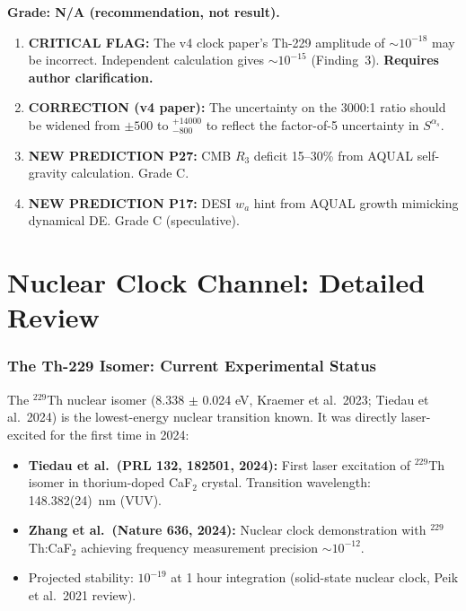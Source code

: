 \documentclass[11pt]{article}
\begin{document}
\begin{tcolorbox}[colback=blue!5!white, colframe=blue!70!black,
  title=\textbf{W4i22 TOP 5 FINDINGS --- PREDICTIONS TEAM}]
\begin{enumerate}
  \textbf{Grade: N/A (recommendation, not result).}

\end{enumerate}
\end{tcolorbox}


\begin{tcolorbox}[colback=red!5!white, colframe=red!60!black,
  title=\textbf{CORRECTIONS AND FLAGS}]
\begin{enumerate}[nosep]
\item \textbf{CRITICAL FLAG:}  The v4 clock paper's Th-229 amplitude of
  $\sim 10^{-18}$ may be incorrect.  Independent calculation gives
  $\sim 10^{-15}$ (Finding~3).  \textbf{Requires author clarification.}

\item \textbf{CORRECTION (v4 paper):}  The uncertainty on the 3000:1
  ratio should be widened from $\pm 500$ to $^{+14000}_{-800}$ to
  reflect the factor-of-5 uncertainty in $S^{\alpha_s}$.

\item \textbf{NEW PREDICTION P27:}  CMB $R_3$ deficit 15--30\% from
  AQUAL self-gravity calculation.  Grade C.

\item \textbf{NEW PREDICTION P17:}  DESI $w_a$ hint from AQUAL growth
  mimicking dynamical DE.  Grade C (speculative).
\end{enumerate}
\end{tcolorbox}


\part{Nuclear Clock Channel: Detailed Review}

\section{The Th-229 Isomer: Current Experimental Status}

The $^{229}$Th nuclear isomer (8.338 $\pm$ 0.024 eV, Kraemer et al.\ 2023;
Tiedau et al.\ 2024) is the lowest-energy nuclear transition known.
It was directly laser-excited for the first time in 2024:

\begin{itemize}
\item \textbf{Tiedau et al.\ (PRL 132, 182501, 2024):}  First laser
  excitation of $^{229}$Th isomer in thorium-doped CaF$_2$ crystal.
  Transition wavelength: 148.382(24)~nm (VUV).
\item \textbf{Zhang et al.\ (Nature 636, 2024):}  Nuclear clock
  demonstration with $^{229}$Th:CaF$_2$ achieving frequency measurement
  precision $\sim 10^{-12}$.
\item Projected stability: $10^{-19}$ at 1 hour integration
  (solid-state nuclear clock, Peik et al.\ 2021 review).
\end{itemize}
\end{document}

